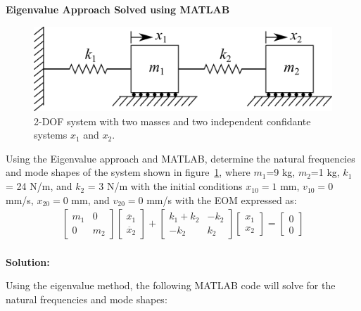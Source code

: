 \documentclass[12pt,letter]{article}
\begin{document}
	
	
		\begin{example}
		\textbf{Eigenvalue Approach Solved using MATLAB}
		
		\begin{figure}[H]
			\centering
			\includegraphics[]{../figures/2-DOF-spring_mass_horizontal.png}
			\caption{2-DOF system with two masses and two independent confidante systems $x_1$ and $x_2$.}
			\label{fig:2-DOF-spring_mass_horizontal_2}
		\end{figure}
		
		\noindent Using the Eigenvalue approach and MATLAB, determine the natural frequencies and mode shapes of the system shown in figure~\ref{fig:2-DOF-spring_mass_horizontal_2}, where $m_1$=9 kg, $m_2$=1 kg, $k_1$ = 24 N/m, and $k_2$ = 3 N/m with the initial conditions $x_{10}=1$ mm, $v_{10}=0$ mm/s, $x_{20}=0$ mm, and $v_{20}=0$ mm/s with the EOM expressed as: 
		\begin{eqnarray}
		  \begin{bmatrix} m_1 & 0  \\  0 & m_2 \end{bmatrix}\begin{bmatrix} \ddot{x_1} \\  \ddot{x_2} \end{bmatrix} + \begin{bmatrix} k_1+k_2 & -k_2  \\  -k_2 & k_2 \end{bmatrix}\begin{bmatrix} x_1 \\  x_2 \end{bmatrix} = \begin{bmatrix} 0 \\  0 \end{bmatrix}
		\end{eqnarray} \\
	
		\noindent \textbf{Solution:} 
	
	\noindent Using the eigenvalue method, the following MATLAB code will solve for the natural frequencies and mode shapes:
		

\end{example}
\end{document}
